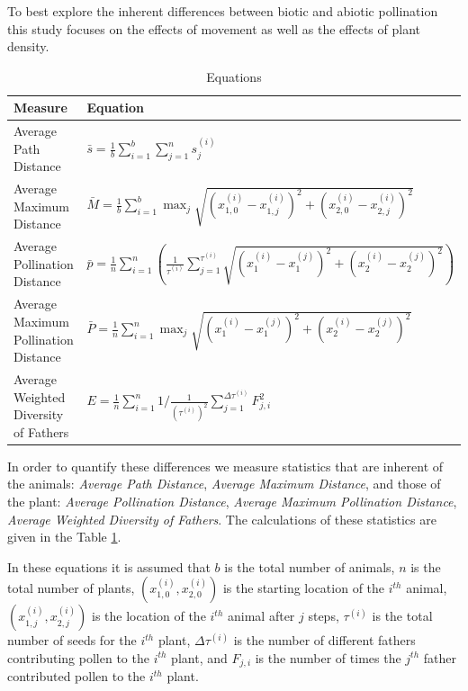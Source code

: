   To best explore the inherent differences between biotic and abiotic pollination this study focuses
  on the effects of movement as well as the effects of plant density.  
  \begin{table}[h]\label{eqn}
  \setlength{\extrarowheight}{10pt}
    {\footnotesize
    \begin{tabular}{|l|l|}
      \hline
      Measure & Equation \\[8pt] \hline   \hline
      Average Path Distance & $\bar{s} = \frac{1}{b} \sum_{i=1}^b \sum_{j=1}^n s^{\left(i\right)}_j$ \\[8pt] \hline
      Average Maximum Distance & $ \bar{M} = \frac{1}{b} \sum_{i=1}^b \max_j \sqrt{\left(x^{\left(i\right)}_{1,0}
    - x^{\left(i\right)}_{1,j}\right)^2 +
          \left(x^{\left(i\right)}_{2,0} -
    x^{\left(i\right)}_{2,j}\right)^2}  $ \\[8pt] \hline
      Average Pollination Distance & $ \bar{p} = \frac{1}{n} \sum_{i=1}^{n} \left(
    \frac{1}{\tau^{\left(i\right)}} \sum_{j=1}^{\tau^{\left(i\right)}}
    \sqrt{\left(x^{\left(i\right)}_1 -
    x^{\left(j\right)}_1\right)^2 + \left(x^{\left(i\right)}_2 -
        x^{\left(j\right)}_2\right)^2}
        \right)  $ \\[12pt]  \hline
      Average Maximum Pollination Distance & $ \bar{P} = \frac{1}{n} \sum_{i=1}^{n} \max_j \sqrt{\left(x^{\left(i\right)}_1 -
    x^{\left(j\right)}_1\right)^2 + \left(x^{\left(i\right)}_2 -
        x^{\left(j\right)}_2\right)^2}$ \\[8pt]  \hline
      Average Weighted Diversity of Fathers & $ E = \frac{1}{n} \sum_{i=1}^n 1/\frac{1}{\left(\tau^{\left(i\right)}\right)^2}
      \sum_{j=1}^{\Delta\tau^{\left(i\right)}} F^2_{j,i} $ \\[8pt]
      \hline
    \end{tabular}
  }
    \caption{Equations}
  \end{table}
  In order to quantify these differences we measure statistics that are inherent of the animals:
  \emph{Average Path Distance}, \emph{Average Maximum Distance}, and those of the plant:
  \emph{Average Pollination Distance}, \emph{Average Maximum Pollination Distance}, \emph{Average
  Weighted Diversity of Fathers}.  The calculations of these statistics are given in the Table
  \ref{eqn}.

  In these equations it is assumed that $b$ is the total number of animals, $n$ is the total number
  of plants, $(x_{1,0}^{(i)},x_{2,0}^{(i)})$ is the starting location of the $i^{th}$ animal,
  $(x_{1,j}^{(i)},x_{2,j}^{(i)})$ is the location of the $i^{th}$ animal after $j$ steps,
  $\tau^{(i)}$ is the total number of seeds for the $i^{th}$ plant, $\Delta\tau^{(i)}$ is the number
  of different fathers contributing pollen to the $i^{th}$ plant, and $F_{j,i}$ is the number of
  times the $j^{th}$ father contributed pollen to the $i^{th}$ plant.

